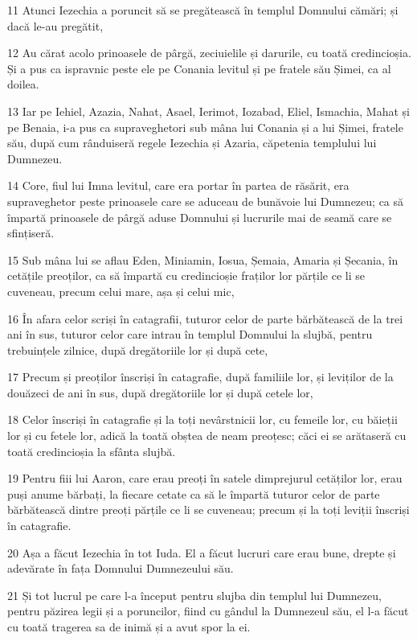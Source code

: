 \par 11 Atunci Iezechia a poruncit să se pregătească în templul Domnului cămări; și dacă le-au pregătit,
\par 12 Au cărat acolo prinoasele de pârgă, zeciuielile și darurile, cu toată credincioșia. Și a pus ca ispravnic peste ele pe Conania levitul și pe fratele său Șimei, ca al doilea.
\par 13 Iar pe Iehiel, Azazia, Nahat, Asael, Ierimot, Iozabad, Eliel, Ismachia, Mahat și pe Benaia, i-a pus ca supraveghetori sub mâna lui Conania și a lui Șimei, fratele său, după cum rânduiseră regele Iezechia și Azaria, căpetenia templului lui Dumnezeu.
\par 14 Core, fiul lui Imna levitul, care era portar în partea de răsărit, era supraveghetor peste prinoasele care se aduceau de bunăvoie lui Dumnezeu; ca să împartă prinoasele de pârgă aduse Domnului și lucrurile mai de seamă care se sfințiseră.
\par 15 Sub mâna lui se aflau Eden, Miniamin, Iosua, Șemaia, Amaria și Șecania, în cetățile preoților, ca să împartă cu credincioșie fraților lor părțile ce li se cuveneau, precum celui mare, așa și celui mic,
\par 16 În afara celor scriși în catagrafii, tuturor celor de parte bărbătească de la trei ani în sus, tuturor celor care intrau în templul Domnului la slujbă, pentru trebuințele zilnice, după dregătoriile lor și după cete,
\par 17 Precum și preoților înscriși în catagrafie, după familiile lor, și leviților de la douăzeci de ani în sus, după dregătoriile lor și după cetele lor,
\par 18 Celor înscriși în catagrafie și la toți nevârstnicii lor, cu femeile lor, cu băieții lor și cu fetele lor, adică la toată obștea de neam preoțesc; căci ei se arătaseră cu toată credincioșia la sfânta slujbă.
\par 19 Pentru fiii lui Aaron, care erau preoți în satele dimprejurul cetăților lor, erau puși anume bărbați, la fiecare cetate ca să le împartă tuturor celor de parte bărbătească dintre preoți părțile ce li se cuveneau; precum și la toți leviții înscriși în catagrafie.
\par 20 Așa a făcut Iezechia în tot Iuda. El a făcut lucruri care erau bune, drepte și adevărate în fața Domnului Dumnezeului său.
\par 21 Și tot lucrul pe care l-a început pentru slujba din templul lui Dumnezeu, pentru păzirea legii și a poruncilor, fiind cu gândul la Dumnezeul său, el l-a făcut cu toată tragerea sa de inimă și a avut spor la ei.

